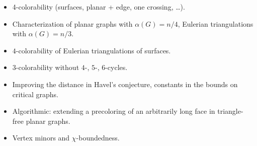 \documentclass[12pt,twoside,openright,a4paper]{book}
\begin{document}
\begin{itemize}
\item 4-colorability (surfaces, planar + edge, one crossing, \ldots).
\item Characterization of planar graphs with $\alpha(G)=n/4$, Eulerian triangulations with $\alpha(G)=n/3$.
\item $4$-colorability of Eulerian triangulations of surfaces.
\item $3$-colorability without $4$-, $5$-, $6$-cycles.
\item Improving the distance in Havel's conjecture, constants in the bounds on critical graphs.
\item Algorithmic: extending a precoloring of an arbitrarily long face in triangle-free planar graphs.
\item Vertex minors and $\chi$-boundedness.
\end{itemize}

\newpage
\pagestyle{plain}
\printindex



\end{document}
